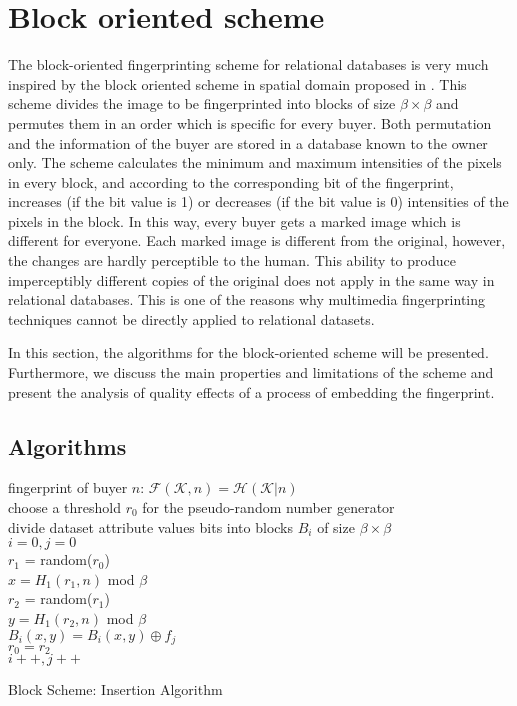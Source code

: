 \section{Block oriented scheme}\label{subsec:block-oriented-scheme}
The block-oriented fingerprinting scheme for relational databases is very much inspired by the block oriented scheme in spatial domain proposed in \cite{das2002robust}.
This scheme divides the image to be fingerprinted into blocks of size $\beta\times\beta$ and permutes them in an order which is specific for every buyer. 
Both permutation and the information of the buyer are stored in a database known to the owner only. 
The scheme calculates the minimum and maximum intensities of the pixels in every block, and according to the corresponding bit of the fingerprint, increases (if the bit value is 1) or decreases (if the bit value is 0) intensities of the pixels in the block. 
In this way, every buyer gets a marked image which is different for everyone. 
Each marked image is different from the original, however, the changes are hardly perceptible to the human. 
This ability to produce imperceptibly different copies of the original does not apply in the same way in relational databases. This is one of the reasons why multimedia fingerprinting techniques cannot be directly applied to relational datasets.

In this section, the algorithms for the block-oriented scheme will be presented.
Furthermore, we discuss the main properties and limitations of the scheme and present the analysis of quality effects of a process of embedding the fingerprint.

\subsection{Algorithms}
\begin{algorithm}
  fingerprint of buyer $n$: $\mathcal{F}(\mathcal{K},n)=\mathcal{H}(\mathcal{K}|n)$
  \\
  choose a threshold $r_0$ for the pseudo-random number generator 
  \\
  divide dataset attribute values bits into blocks $B_i$ of size $\beta \times \beta$ \\
  $i=0,j=0$ \\
  {
    $r_1$ = random($r_0$) \\
    $x=H_1(r_1,n)$ mod $\beta$ \\
    $r_2$ = random($r_1$) \\
    $y=H_1(r_2,n)$ mod $\beta$ \\
    $B_i(x,y)=B_i(x,y) \oplus f_j$ \\
    $r_0=r_2$ \\
    $i++, j++$ \\
  }
  \caption{Block Scheme: Insertion Algorithm}
  \label{alg:block-insertion} 
  
\end{algorithm}

